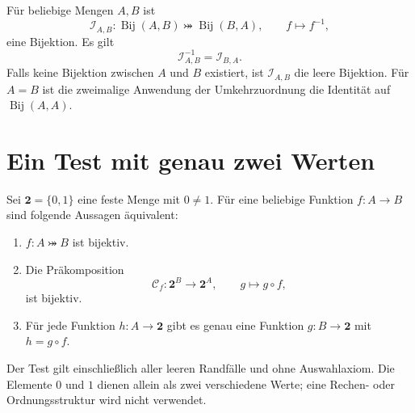 \begin{theorem}
\label{b08guide:thm:inverse-assignment}
Für beliebige Mengen $A,B$ ist
\[
 \mathcal I_{A,B}\colon\operatorname{Bij}(A,B)
                  \bij\operatorname{Bij}(B,A),
 \qquad f\mapsto f^{-1},
\]
eine Bijektion. Es gilt
\[
 \mathcal I_{A,B}^{-1}=\mathcal I_{B,A}.
\]
Falls keine Bijektion zwischen $A$ und $B$ existiert,
ist $\mathcal I_{A,B}$ die leere Bijektion. Für $A=B$ ist
die zweimalige Anwendung der Umkehrzuordnung die Identität
auf $\operatorname{Bij}(A,A)$.
\end{theorem}

\section{Ein Test mit genau zwei Werten}

\begin{theorem}
\label{b08guide:thm:two-value-test}
Sei $\mathbf 2=\{0,1\}$ eine feste Menge mit $0\ne1$.
Für eine beliebige Funktion $f\colon A\to B$ sind folgende
Aussagen äquivalent:
\begin{enumerate}
 \item $f\colon A\bij B$ ist bijektiv.
 \item Die Präkomposition
 \[
  \mathcal C_f\colon\mathbf 2^B\to\mathbf 2^A,
  \qquad g\mapsto g\circ f,
 \]
 ist bijektiv.
 \item Für jede Funktion $h\colon A\to\mathbf 2$ gibt es
 genau eine Funktion $g\colon B\to\mathbf 2$ mit $h=g\circ f$.
\end{enumerate}
Der Test gilt einschließlich aller leeren Randfälle und ohne
Auswahlaxiom. Die Elemente $0$ und $1$ dienen allein als zwei
verschiedene Werte; eine Rechen- oder Ordnungsstruktur wird
nicht verwendet.
\end{theorem}
